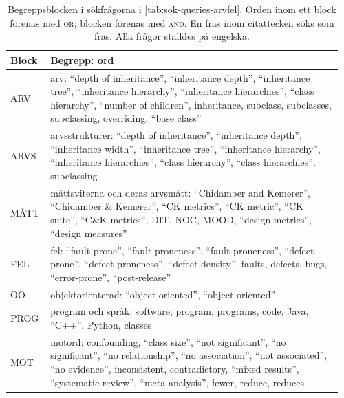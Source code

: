 \begin{table}[!htb]
  \centering
  \caption{Begreppsblocken i sökfrågorna i
    \cref{tab:sok-queries-arvfel}.  Orden inom ett block förenas med
    \textsc{or}; blocken förenas med \textsc{and}.  En fras inom
    citattecken söks som fras.  Alla frågor ställdes på engelska.}
  \label{tab:sok-begrepp-arvfel}
  \footnotesize
  \begin{tabular}{@{}>{\raggedright\arraybackslash}p{0.11\linewidth}%
    >{\raggedright\arraybackslash}p{0.85\linewidth}@{}}
    \toprule
    Block & Begrepp: ord \\
    \midrule
    ARV & arv: \enquote{depth of inheritance}, \enquote{inheritance
      depth}, \enquote{inheritance tree}, \enquote{inheritance
      hierarchy}, \enquote{inheritance hierarchies}, \enquote{class
      hierarchy}, \enquote{number of children}, inheritance, subclass,
      subclasses, subclassing, overriding, \enquote{base class} \\
    ARVS & arvsstrukturer: \enquote{depth of inheritance},
      \enquote{inheritance depth}, \enquote{inheritance width},
      \enquote{inheritance tree}, \enquote{inheritance hierarchy},
      \enquote{inheritance hierarchies}, \enquote{class hierarchy},
      \enquote{class hierarchies}, subclassing \\
    MÅTT & måttsviterna och deras arvsmått: \enquote{Chidamber and
      Kemerer}, \enquote{Chidamber \& Kemerer}, \enquote{CK metrics},
      \enquote{CK metric}, \enquote{CK suite}, \enquote{C\&K metrics},
      DIT, NOC, MOOD, \enquote{design metrics}, \enquote{design
      measures} \\
    FEL & fel: \enquote{fault-prone}, \enquote{fault proneness},
      \enquote{fault-proneness}, \enquote{defect-prone}, \enquote{defect
      proneness}, \enquote{defect density}, faults, defects, bugs,
      \enquote{error-prone}, \enquote{post-release} \\
    OO & objektorienterad: \enquote{object-oriented}, \enquote{object
      oriented} \\
    PROG & program och språk: software, program, programs, code, Java,
      \enquote{C++}, Python, classes \\
    MOT & motord: confounding, \enquote{class size}, \enquote{not
      significant}, \enquote{no significant}, \enquote{no relationship},
      \enquote{no association}, \enquote{not associated}, \enquote{no
      evidence}, inconsistent, contradictory, \enquote{mixed results},
      \enquote{systematic review}, \enquote{meta-analysis}, fewer,
      reduce, reduces \\
    \bottomrule
  \end{tabular}
\end{table}

